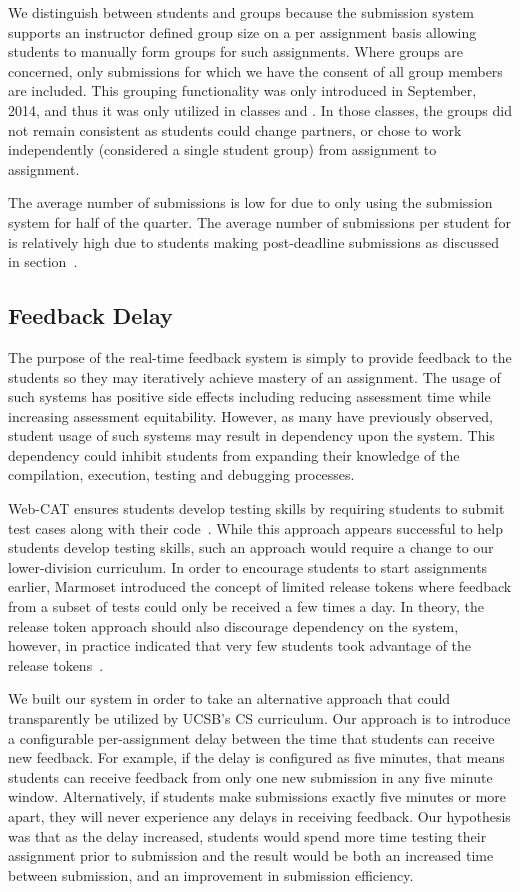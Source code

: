 We distinguish between students and groups because the submission system
supports an instructor defined group size on a per assignment basis allowing
students to manually form groups for such assignments. Where groups are
concerned, only submissions for which we have the consent of all group members
are included. This grouping functionality was only introduced in September,
2014, and thus it was only utilized in classes  and . In
those classes, the groups did not remain consistent as students could change
partners, or chose to work independently (considered a single student group)
from assignment to assignment.

The average number of submissions is low for  due to only using the
submission system for half of the quarter. The average number of submissions
per student for  is relatively high due to students making
post-deadline submissions as discussed in section~.


\subsection{Feedback Delay}
The purpose of the real-time feedback system is simply to provide feedback to
the students so they may iteratively achieve mastery of an assignment. The
usage of such systems has positive side effects including reducing assessment
time while increasing assessment equitability. However, as many have previously
observed, student usage of such systems may result in dependency upon the
system. This dependency could inhibit students from expanding their knowledge
of the compilation, execution, testing and debugging processes.

Web-CAT ensures students develop testing skills by requiring students to submit
test cases along with their code~\cite{Edwards:2003:RCS:949344.949390}. While
this approach appears successful to help students develop testing skills, such
an approach would require a change to our lower-division curriculum. In order
to encourage students to start assignments earlier, Marmoset introduced the
concept of limited release tokens where feedback from a subset of tests could
only be received a few times a day. In theory, the release token approach
should also discourage dependency on the system, however, in practice \spacco{}
indicated that very few students took advantage of the release
tokens~\cite{Spacco:2013:TIP:2462476.2465594}.

We built our system in order to take an alternative approach that could
transparently be utilized by UCSB's CS curriculum. Our approach is to introduce
a configurable per-assignment delay between the time that students can receive
new feedback. For example, if the delay is configured as five minutes, that
means students can receive feedback from only one new submission in any five
minute window. Alternatively, if students make submissions exactly five minutes
or more apart, they will never experience any delays in receiving feedback. Our
hypothesis was that as the delay increased, students would spend more time
testing their assignment prior to submission and the result would be both an
increased time between submission, and an improvement in submission efficiency.

